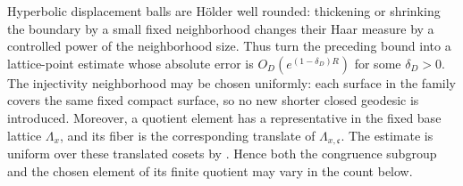 \documentclass[11pt,reqno]{amsart}
\theoremstyle{definition}
\theoremstyle{remark}
\begin{document}
Hyperbolic displacement balls are H\"older well rounded: thickening or
shrinking the boundary by a small fixed neighborhood changes their Haar
measure by a controlled power of the neighborhood size.  Thus
\cite[Theorem~1.9 and Corollaries~1.11, 1.13]
{GorodnikNevoCounting} turn the preceding bound into a lattice-point
estimate whose absolute error is \(O_D(e^{(1-\delta_D)R})\) for some
\(\delta_D>0\).  The injectivity neighborhood may be chosen uniformly:
each surface in the family covers the same fixed compact surface, so no
new shorter closed geodesic is introduced.  Moreover, a quotient
element has a representative in the fixed base lattice \(\Lambda_x\), and
its fiber is the corresponding translate of
\(\Lambda_{x,\mathfrak c}\).  The estimate is uniform over these translated
cosets by \cite[Remark~1.12]{GorodnikNevoCounting}.  Hence both the
congruence subgroup and the chosen element of its finite quotient may vary
in the count below.
\end{document}
